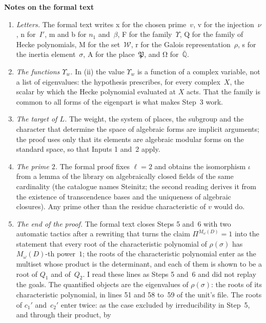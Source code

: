 \documentclass[11pt,a4paper]{article}
\newcommand{\leanfont}{\ttfamily\fontsize{8.6}{10.5}\selectfont\color{leancol}}
\newcommand{\m}[1]{\mbox{$#1$}}        %
\newcommand{\sect}[2]{\refstepcounter{section}\label{#2}\par\addvspace{19pt plus 4pt minus 2pt}\Needspace{7\baselineskip}%
  \noindent\llap{{\fontsize{13.2}{16}\selectfont\bfseries\color{inkfaint}\thesection}\hspace{9pt}}%
  {\fontsize{13.2}{16}\selectfont\bfseries\color{ink}#1}\par\nopagebreak\vspace{-1pt}}
\theoremstyle{plainx}
\theoremstyle{uprightx}
\begin{document}
\sect{Notes on the formal text}{s:notes}
\begin{enumerate}[label=\textup{\arabic*.},leftmargin=1.6em,itemsep=5pt]
\item \emph{Letters.} The formal text writes {\leanfont x} for the chosen prime~$v$, {\leanfont v} for the
injection~$\nu$, {\leanfont n} for~$I'$, {\leanfont m} and {\leanfont b} for $n_1$ and~$\beta$, {\leanfont F} for
the family~$\Upsilon$, {\leanfont Q} for the family of Hecke polynomials, {\leanfont M} for the set~$\mathcal W$,
{\leanfont r} for the Galois representation~$\rho$, {\leanfont s} for the inertia element~$\sigma$, {\leanfont A}
for the place~$\mathfrak P$, and {\leanfont Ω} for~$\bar{\mathbb Q}$.
\item \emph{The functions $\Upsilon_w$.} In (ii) the value $\Upsilon_w$ is a function of a complex variable, not a
list of eigenvalues: the hypothesis prescribes, for every complex~$X$, the scalar by which the Hecke polynomial
evaluated at $X$ acts. That the family is common to all forms of the eigenpart is what makes Step~3 work.
\item \emph{The target of $L$.} The weight, the system of places, the subgroup and the character that determine
the space of algebraic forms are implicit arguments; the proof uses only that its elements are algebraic modular
forms on the standard space, so that Inputs 1 and~2 apply.
\item \emph{The prime $2$.} The formal proof fixes \m{\ell=2} and obtains the isomorphism $\iota$ from a lemma of
the library on algebraically closed fields of the same cardinality (the catalogue names Steinitz; the second
reading derives it from the existence of transcendence bases and the uniqueness of algebraic closures). Any
prime other than the residue characteristic of $v$ would do.
\item \emph{The end of the proof.} The formal text closes Steps 5 and~6 with two automatic tactics after a
rewriting that turns the claim \m{\Pi^{M_\omega(D)}=1} into the statement that every root of the characteristic
polynomial of \m{\rho(\sigma)} has $M_\omega(D)$-th power~$1$; the roots of the characteristic polynomial enter as
the multiset whose product is the determinant, and each of them is shown to be a root of $Q_1$ and of~$Q_2$. I
read these lines as Steps 5 and~6 and did not replay the goals. The quantified objects are the eigenvalues of
\m{\rho(\sigma)}: the roots of its characteristic polynomial, in lines 51 and 58 to~59 of the unit's file. The roots
of $c_1'$ and~$c_2'$ enter twice: as the case excluded by irreducibility in Step~5, and through their product, by

\end{enumerate}
\end{document}
